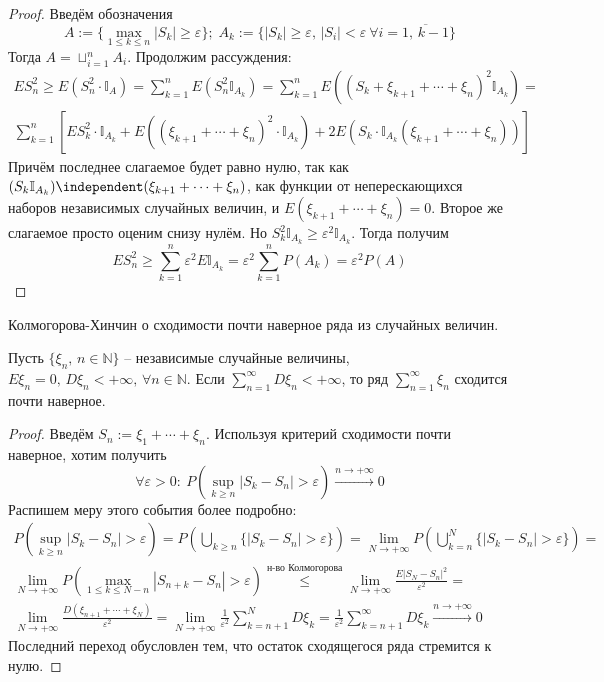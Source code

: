 \begin{proof}
	Введём обозначения
	\[A := \{\max_{1 \leq k \leq n} |S_k| \geq \varepsilon\};\; A_k := \{|S_k| \geq \varepsilon,\, |S_i| < \varepsilon \: \forall i = \overline{1,\,k-1}\}\]
	Тогда $A = \sqcup_{i = 1}^n A_i$. Продолжим рассуждения:
	\begin{align*}
		ES_n^2 \geq E(S_n^2 \cdot\mathbb{I}_A) = \sum_{k = 1}^n E(S_n^2\mathbb{I}_{A_k}) = \sum_{k = 1}^n E((S_k + \xi_{k + 1} + \cdots + \xi_n)^2\mathbb{I}_{A_k}) = \\
		\sum_{k = 1}^n \left[ES_k^2\cdot\mathbb{I}_{A_k} + E\left((\xi_{k + 1} + \cdots + \xi_n)^2\cdot\mathbb{I}_{A_k}\right) + 2E(S_k\cdot\mathbb{I}_{A_k}(\xi_{k + 1} + \cdots + \xi_n)) \right]
	\end{align*}
	Причём последнее слагаемое будет равно нулю, так как $(S_k\mathbb{I}_{A_k}) \independent (\xi_{k + 1} + \cdots + \xi_n)$, как функции от неперескающихся наборов независимых случайных величин, и $E(\xi_{k + 1} + \cdots + \xi_n) = 0$. Второе же слагаемое просто оценим снизу нулём. Но $S_k^2\mathbb{I}_{A_k} \geq \varepsilon^2\mathbb{I}_{A_k}$. Тогда получим
	\[ES_n^2 \geq \sum_{k = 1}^n\varepsilon^2E\mathbb{I}_{A_k} = \varepsilon^2 \sum_{k = 1}^n P(A_k) = \varepsilon^2 P(A)\]
\end{proof}

\begin{theorem}
	Колмогорова-Хинчин о сходимости почти наверное ряда из случайных величин.

	Пусть $\{\xi_n,\, n \in \mathbb{N}\}$ -- независимые случайные величины, $E\xi_n = 0,\, D\xi_n < +\infty,\, \forall n \in \mathbb{N}$. Если $\sum_{n = 1}^\infty D\xi_n < +\infty$, то ряд $\sum_{n = 1}^\infty \xi_n$ сходится почти наверное.
\end{theorem}

\begin{proof}
	Введём $S_n := \xi_1 + \cdots + \xi_n$. Используя критерий сходимости почти наверное, хотим получить
	\[\forall \varepsilon > 0:\: P\left(\sup_{k \geq n} |S_k - S_n| > \varepsilon\right) \stackrel{n \to +\infty}{\to} 0\]
	Распишем меру этого события более подробно:
	\begin{align*}
		P\left(\sup_{k \geq n} |S_k - S_n| > \varepsilon\right) = P\left(\bigcup_{k \geq n}\{|S_k - S_n| > \varepsilon\}\right) = \lim_{N \to +\infty} P\left(\bigcup_{k = n}^N \{|S_k - S_n| > \varepsilon\}\right) = \\
		\lim_{N \to +\infty} P\left(\max_{1 \leq k \leq N - n} |S_{n + k} - S_n| > \varepsilon\right) \stackrel{\text{н-во Колмогорова}}{\leq} \lim_{N \to +\infty} \frac{E|S_N - S_n|^2}{\varepsilon^2} =             \\
		\lim_{N \to +\infty} \frac{D(\xi_{n + 1} + \cdots + \xi_N)}{\varepsilon^2} = \lim_{N \to +\infty} \frac{1}{\varepsilon^2}\sum_{k = n + 1}^N D\xi_k = \frac{1}{\varepsilon^2} \sum_{k = n + 1}^\infty D\xi_k \stackrel{n \to +\infty}{\to} 0
	\end{align*}
	Последний переход обусловлен тем, что остаток сходящегося ряда стремится к нулю.
\end{proof}
